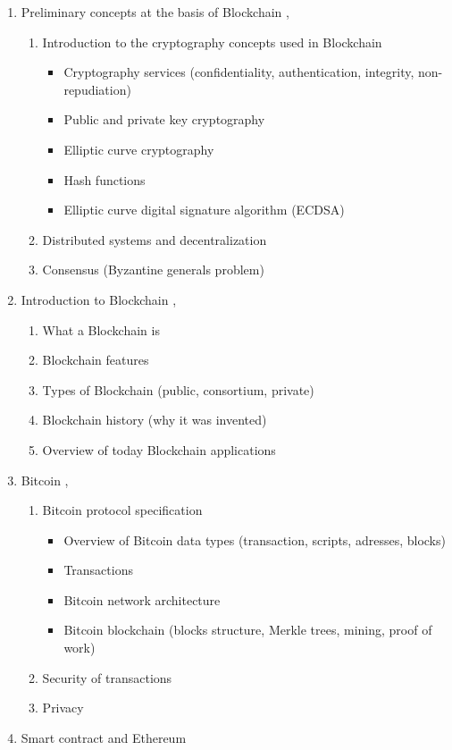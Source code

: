 \documentclass[12pt, a4paper]{article}
\begin{document}
  \begin{enumerate}
    \item Preliminary concepts at the basis of Blockchain \cite{bambara2018blockchain},\cite{bashir2017mastering}
    \begin{enumerate}
      \item Introduction to the cryptography concepts used in Blockchain \cite{bashir2017mastering}
      \begin{itemize}
        \item Cryptography services (confidentiality, authentication, integrity, non-repudiation)
        \item Public and private key cryptography
        \item Elliptic curve cryptography
        \item Hash functions
        \item Elliptic curve digital signature algorithm (ECDSA)
      \end{itemize}
      \item Distributed systems and decentralization
      \item Consensus (Byzantine generals problem)
    \end{enumerate}

    \item Introduction to Blockchain \cite{bambara2018blockchain},\cite{bashir2017mastering}
    \begin{enumerate}
      \item What a Blockchain is
      \item Blockchain features
      \item Types of Blockchain (public, consortium, private)
      \item Blockchain history (why it was invented)
      \item Overview of today Blockchain applications
    \end{enumerate}

    \item Bitcoin \cite{karame2016bitcoin},\cite{antonopoulos2014mastering}
    \begin{enumerate}
      \item Bitcoin protocol specification
      \begin{itemize}
        \item Overview of Bitcoin data types (transaction, scripts, adresses, blocks)
        \item Transactions
        \item Bitcoin network architecture
        \item Bitcoin blockchain (blocks structure, Merkle trees, mining, proof of
        work)
      \end{itemize}
      \item Security of transactions
      \item Privacy
    \end{enumerate}

    \item Smart contract and Ethereum
  \end{enumerate}

  \printbibliography
\end{document}
